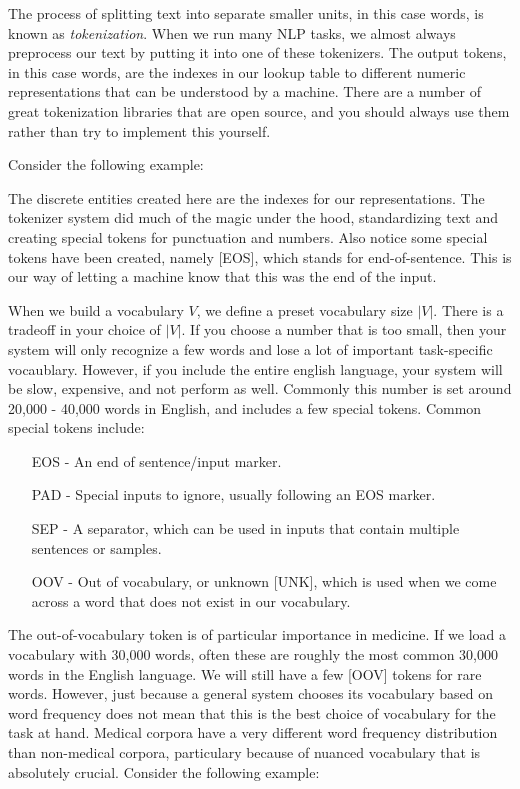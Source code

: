 The process of splitting text into separate smaller units, in this case words, is known as \textit{tokenization}. When we run many NLP tasks, we almost always preprocess our text by putting it into one of these tokenizers. The output tokens,
in this case words, are the indexes in our lookup table to different numeric representations that can be understood by a machine. There are a number of great tokenization libraries that are open source, and you should always use them rather than
try to implement this yourself.

Consider the following example:


The discrete entities created here are the indexes for our representations. The tokenizer system did much of the magic under the hood, standardizing text and creating special tokens for punctuation and numbers. Also notice
some special tokens have been created, namely [EOS], which stands for end-of-sentence. This is our way of letting a machine know that this was the end of the input.

When we build a vocabulary $V$, we define a preset vocabulary size $|V|$. There is a tradeoff in your choice of $|V|$. If you choose a number that is too small, then
your system will only recognize a few words and lose a lot of important task-specific vocaublary. However, if you include the entire english language, your system will be slow, expensive, and not perform as well.
Commonly this number is set around 20,000 - 40,000 words in English, and includes a few special tokens. Common special tokens include:
\begin{itemize}
  \item [EOS] - An end of sentence/input marker.
  \item [PAD] - Special inputs to ignore, usually following an EOS marker.
  \item [SEP] - A separator, which can be used in inputs that contain multiple sentences or samples.
  \item [OOV] - Out of vocabulary, or unknown [UNK], which is used when we come across a word that does not exist in our vocabulary.
\end{itemize}

The out-of-vocabulary token is of particular importance in medicine. If we load a vocabulary with 30,000 words, often these are roughly the most common 30,000 words in the English language. We will still have a few [OOV] tokens
for rare words. However, just because a general system chooses its vocabulary based on word frequency does not mean that this is the best choice of vocabulary for the task at hand. Medical corpora have a very different word frequency
distribution than non-medical corpora, particulary because of nuanced vocabulary that is absolutely crucial. Consider the following example:

